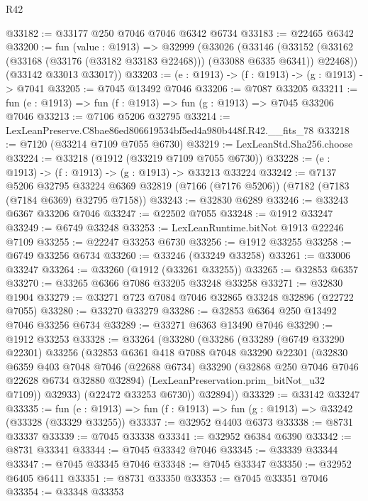 \begin{lexlean}{R42}
\begin{coremodule}
{@33182 := @33177 @250 @7046 @7046 @6342 @6734
@33183 := @22465 @6342
@33200 := fun (value : @1913) =>
  @32999
    (@33026
      (@33146
        (@33152 (@33162 (@33168 (@33176 (@33182 @33183 @22468))) (@33088 @6335 @6341)) @22468))
      (@33142 @33013 @33017))
@33203 := (e : @1913) -> (f : @1913) -> (g : @1913) -> @7041
@33205 := @7045 @13492 @7046
@33206 := @7087 @33205
@33211 := fun (e : @1913) => fun (f : @1913) => fun (g : @1913) => @7045 @33206 @7046
@33213 := @7106 @5206 @32795
@33214 := LexLeanPreserve.C8bae86ed806619534bf5ed4a980b448f.R42.__fits_78
@33218 := @7120 (@33214 @7109 @7055 @6730)
@33219 := LexLeanStd.Sha256.choose
@33224 := @33218 (@1912 (@33219 @7109 @7055 @6730))
@33228 := (e : @1913) -> (f : @1913) -> (g : @1913) -> @33213 @33224
@33242 := @7137
    @5206
    @32795
    @33224
    @6369
    @32819
    (@7166 (@7176 @5206))
    (@7182 (@7183 (@7184 @6369) @32795 @7158))
@33243 := @32830 @6289
@33246 := @33243 @6367 @33206 @7046
@33247 := @22502 @7055
@33248 := @1912 @33247
@33249 := @6749 @33248
@33253 := LexLeanRuntime.bitNot @1913 @22246 @7109
@33255 := @22247 @33253 @6730
@33256 := @1912 @33255
@33258 := @6749 @33256 @6734
@33260 := @33246 (@33249 @33258)
@33261 := @33006 @33247
@33264 := @33260 (@1912 (@33261 @33255))
@33265 := @32853 @6357
@33270 := @33265 @6366 @7086 @33205 @33248 @33258
@33271 := @32830 @1904
@33279 := @33271 @723 @7084 @7046 @32865 @33248 @32896 (@22722 @7055)
@33280 := @33270 @33279
@33286 := @32853 @6364 @250 @13492 @7046 @33256 @6734
@33289 := @33271 @6363 @13490 @7046
@33290 := @1912 @33253
@33328 := @33264
    (@33280
      (@33286
        (@33289
          (@6749 @33290 @22301)
          @33256
          (@32853
            @6361
            @418
            @7088
            @7048
            @33290
            @22301
            (@32830
              @6359
              @403
              @7048
              @7046
              (@22688 @6734)
              @33290
              (@32868 @250 @7046 @7046 @22628 @6734 @32880 @32894)
              (LexLeanPreservation.prim_bitNot_u32 @7109))
            @32933)
          (@22472 @33253 @6730))
        @32894))
@33329 := @33142 @33247
@33335 := fun (e : @1913) => fun (f : @1913) => fun (g : @1913) => @33242 (@33328 (@33329 @33255))
@33337 := @32952 @4403 @6373
@33338 := @8731 @33337
@33339 := @7045 @33338
@33341 := @32952 @6384 @6390
@33342 := @8731 @33341
@33344 := @7045 @33342 @7046
@33345 := @33339 @33344
@33347 := @7045 @33345 @7046
@33348 := @7045 @33347
@33350 := @32952 @6405 @6411
@33351 := @8731 @33350
@33353 := @7045 @33351 @7046
@33354 := @33348 @33353
}
\end{coremodule}
\end{lexlean}
